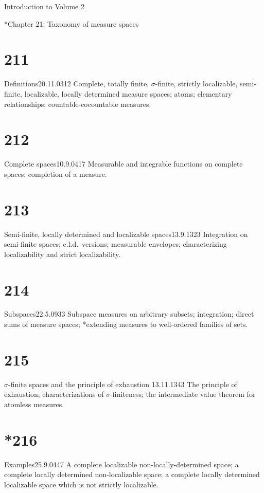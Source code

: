 
Introduction to Volume 2 


 *Chapter 21: Taxonomy of measure spaces


\section{211}{Definitions}{20.11.03}{12}{}
{Complete, totally finite, $\sigma$-finite, strictly localizable,
semi-finite, localizable, locally determined measure spaces;  atoms;
elementary relationships;  countable-cocountable measures.}

\section{212}{Complete spaces}{10.9.04}{17}{}
{Measurable and integrable functions on complete spaces;
completion of a measure.}

\section{213}{Semi-finite, locally determined and localizable
spaces}{13.9.13}{23}{}
{Integration on semi-finite spaces;  c.l.d.\ versions;  measurable
envelopes;  characterizing localizability and strict localizability.}

\section{214}{Subspaces}{22.5.09}{33}{}
{Subspace measures on arbitrary subsets;  integration;  direct
sums of measure spaces;  *extending measures to well-ordered families of
sets.}

\section{215}{$\sigma$-finite spaces and the principle of exhaustion}
{13.11.13}{43}{}
{The principle of exhaustion;  characterizations of $\sigma$-finiteness;
the intermediate value theorem for atomless measures.}

\section{*216}{Examples}{25.9.04}{47}{}
{A complete localizable non-locally-determined space;  a complete
locally determined non-localizable space;  a complete locally determined
localizable space which is not strictly localizable.}

